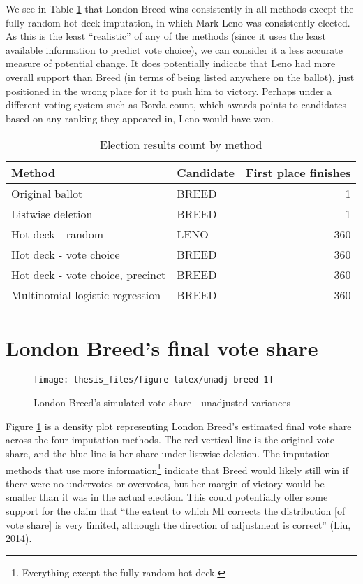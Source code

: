 \documentclass[12pt,twoside]{reedthesis}
\begin{document}
We see in Table \ref{tab:method-results} that London Breed wins consistently in all methods except the fully random hot deck imputation, in which Mark Leno was consistently elected. As this is the least ``realistic'' of any of the methods (since it uses the least available information to predict vote choice), we can consider it a less accurate measure of potential change. It does potentially indicate that Leno had more overall support than Breed (in terms of being listed anywhere on the ballot), just positioned in the wrong place for it to push him to victory. Perhaps under a different voting system such as Borda count, which awards points to candidates based on any ranking they appeared in, Leno would have won.
\begin{table}[t]

\caption[Winner by method]{\label{tab:method-results}Election results count by method}
\centering
\begin{tabular}{llr}
\toprule
Method & Candidate & First place finishes\\
\midrule
Original ballot & BREED & 1\\
Listwise deletion & BREED & 1\\
Hot deck - random & LENO & 360\\
Hot deck - vote choice & BREED & 360\\
Hot deck - vote choice, precinct & BREED & 360\\
\addlinespace
Multinomial logistic regression & BREED & 360\\
\bottomrule
\end{tabular}
\end{table}
\hypertarget{london-breeds-final-vote-share}{%
\section{London Breed's final vote share}\label{london-breeds-final-vote-share}}
\begin{figure}
\texttt{[image: thesis\_files/figure-latex/unadj-breed-1]} \caption{London Breed's simulated vote share - unadjusted variances}\label{fig:unadj-breed}
\end{figure}
Figure \ref{fig:unadj-breed} is a density plot representing London Breed's estimated final vote share across the four imputation methods. The red vertical line is the original vote share, and the blue line is her share under listwise deletion. The imputation methods that use more information\footnote{Everything except the fully random hot deck.} indicate that Breed would likely still win if there were no undervotes or overvotes, but her margin of victory would be smaller than it was in the actual election. This could potentially offer some support for the claim that ``the extent to which MI corrects the distribution {[}of vote share{]} is very limited, although the direction of adjustment is correct'' (Liu, 2014).
\end{document}
